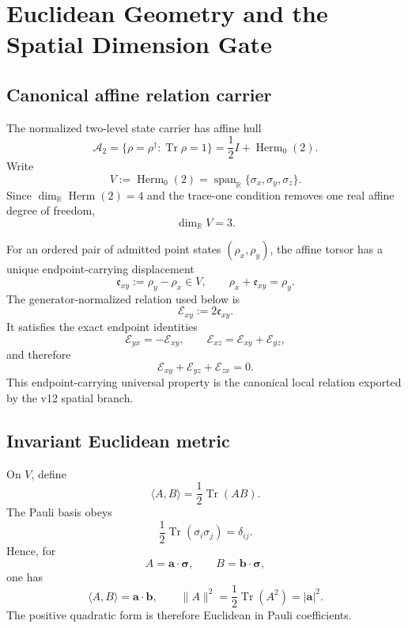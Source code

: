 \clearpage

\chapter{Euclidean Geometry and the Spatial Dimension Gate}
\label{ch:v12_euclidean_dimension}

\section{Canonical affine relation carrier}

The normalized two-level state carrier has affine hull
\[
\mathcal A_2
=
\{\rho=\rho^\dagger:\operatorname{Tr}\rho=1\}
=
\frac12I+\operatorname{Herm}_0(2).
\]
Write
\[
V:=\operatorname{Herm}_0(2)
=
\operatorname{span}_{\mathbb R}\{\sigma_x,\sigma_y,\sigma_z\}.
\]
Since \(\dim_{\mathbb R}\operatorname{Herm}(2)=4\) and the trace-one condition removes one
real affine degree of freedom,
\[
\boxed{\dim_{\mathbb R}V=3.}
\]

For an ordered pair of admitted point states \((\rho_x,\rho_y)\), the affine torsor
has a unique endpoint-carrying displacement
\[
\boxed{\mathfrak e_{xy}:=\rho_y-\rho_x\in V},
\qquad
\rho_x+\mathfrak e_{xy}=\rho_y.
\]
The generator-normalized relation used below is
\[
\boxed{\mathcal E_{xy}:=2\mathfrak e_{xy}.}
\]
It satisfies the exact endpoint identities
\[
\mathcal E_{yx}=-\mathcal E_{xy},
\qquad
\boxed{\mathcal E_{xz}=\mathcal E_{xy}+\mathcal E_{yz}},
\]
and therefore
\[
\mathcal E_{xy}+\mathcal E_{yz}+\mathcal E_{zx}=0.
\]
This endpoint-carrying universal property is the canonical local relation exported
by the v12 spatial branch.

\section{Invariant Euclidean metric}

On \(V\), define
\[
\boxed{
\langle A,B\rangle
=
\frac12\operatorname{Tr}(AB).
}
\]
The Pauli basis obeys
\[
\frac12\operatorname{Tr}(\sigma_i\sigma_j)=\delta_{ij}.
\]
Hence, for
\[
A=\mathbf a\cdot\boldsymbol\sigma,
\qquad
B=\mathbf b\cdot\boldsymbol\sigma,
\]
one has
\[
\boxed{
\langle A,B\rangle=\mathbf a\cdot\mathbf b,
\qquad
\|A\|^2=\frac12\operatorname{Tr}(A^2)=|\mathbf a|^2.
}
\]
The positive quadratic form is therefore Euclidean in Pauli coefficients.

